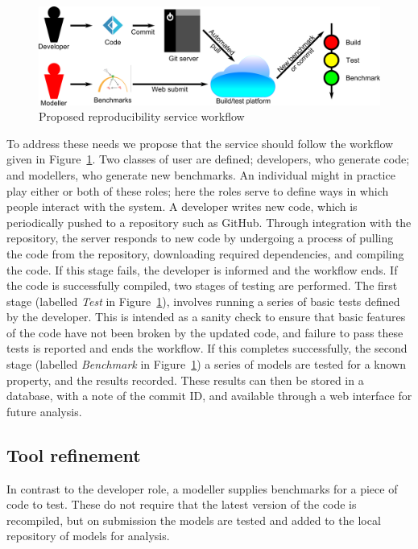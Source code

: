 \documentclass{llncs}
\begin{document}
\begin{figure}[!ht]
	\centering
	\includegraphics[width=\textwidth]{workflow}
	\caption{Proposed reproducibility service workflow}
	\label{schematic}
\end{figure}

To address these needs we propose that the service should follow the
workflow given in Figure~\ref{schematic}. Two classes of user are
defined; developers, who generate code; and modellers, who generate
new benchmarks. An individual might in practice play either or both of
these roles; here the roles serve to define ways in which people
interact with the system. A developer writes new code, which is
periodically pushed to a repository such as GitHub. Through
integration with the repository, the server responds to new code by
undergoing a process of pulling the code from the repository,
downloading required dependencies, and compiling the code. If this
stage fails, the developer is informed and the workflow ends. If the
code is successfully compiled, two stages of testing are
performed. The first stage (labelled {\emph{Test}} in
Figure~\ref{schematic}), involves running a series of basic tests
defined by the developer. This is intended as a sanity check to ensure
that basic features of the code have not been broken by the updated
code, and failure to pass these tests is reported and ends the
workflow. If this completes successfully, the second stage (labelled
{\emph{Benchmark}} in Figure~\ref{schematic}) a series of models are
tested for a known property, and the results recorded. These results
can then be stored in a database, with a note of the commit ID, and
available through a web interface for future analysis.

\subsection{Tool refinement}

In contrast to the developer role, a modeller supplies benchmarks for
a piece of code to test. These do not require that the latest version
of the code is recompiled, but on submission the models are tested and
added to the local repository of models for analysis.
\end{document}
